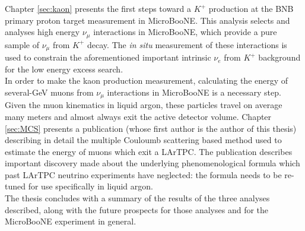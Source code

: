 Chapter \ref{sec:kaon} presents the first steps toward a $K^+$ production at the BNB primary proton target measurement in MicroBooNE. This analysis selects and analyses high energy $\nu_\mu$ interactions in MicroBooNE, which provide a pure sample of $\nu_\mu$ from $K^+$ decay. The \textit{in situ} measurement of these interactions is used to constrain the aforementioned important intrinsic $\nu_e$ from $K^+$ background for the low energy excess search.\\

In order to make the kaon production measurement, calculating the energy of several-GeV muons from $\nu_\mu$ interactions in MicroBooNE is a necessary step. Given the muon kinematics in liquid argon, these particles travel on average many meters and almost always exit the active detector volume. Chapter \ref{sec:MCS} presents a publication (whose first author is the author of this thesis) describing in detail the multiple Couloumb scattering based method used to estimate the energy of muons which exit a LArTPC. The publication describes important discovery made about the underlying phenomenological formula which past LArTPC neutrino experiments have neglected: the formula needs to be re-tuned for use specifically in liquid argon.\\

The thesis concludes with a summary of the results of the three analyses described, along with the future prospects for those analyses and for the MicroBooNE experiment in general.



